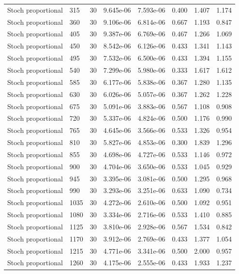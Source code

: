 \begin{scriptsize}
\begin{longtable}{llrrrrrr}
Stoch proportional & 315 & 30 & 9.645e-06 & 7.593e-06 & 0.400 & 1.407 & 1.174 \\
Stoch proportional & 360 & 30 & 9.106e-06 & 6.814e-06 & 0.667 & 1.193 & 0.847 \\
Stoch proportional & 405 & 30 & 9.387e-06 & 6.769e-06 & 0.467 & 1.266 & 1.069 \\
Stoch proportional & 450 & 30 & 8.542e-06 & 6.126e-06 & 0.433 & 1.341 & 1.143 \\
Stoch proportional & 495 & 30 & 7.532e-06 & 6.500e-06 & 0.433 & 1.394 & 1.155 \\
Stoch proportional & 540 & 30 & 7.299e-06 & 5.980e-06 & 0.333 & 1.617 & 1.612 \\
Stoch proportional & 585 & 30 & 6.177e-06 & 5.838e-06 & 0.367 & 1.280 & 1.135 \\
Stoch proportional & 630 & 30 & 6.026e-06 & 5.057e-06 & 0.367 & 1.262 & 1.228 \\
Stoch proportional & 675 & 30 & 5.091e-06 & 3.883e-06 & 0.567 & 1.108 & 0.908 \\
Stoch proportional & 720 & 30 & 5.337e-06 & 4.824e-06 & 0.500 & 1.176 & 0.990 \\
Stoch proportional & 765 & 30 & 4.645e-06 & 3.566e-06 & 0.533 & 1.326 & 0.954 \\
Stoch proportional & 810 & 30 & 5.827e-06 & 4.853e-06 & 0.300 & 1.839 & 1.296 \\
Stoch proportional & 855 & 30 & 4.698e-06 & 4.727e-06 & 0.533 & 1.146 & 0.972 \\
Stoch proportional & 900 & 30 & 4.704e-06 & 3.650e-06 & 0.533 & 1.045 & 0.929 \\
Stoch proportional & 945 & 30 & 3.395e-06 & 3.081e-06 & 0.500 & 1.295 & 0.968 \\
Stoch proportional & 990 & 30 & 3.293e-06 & 3.251e-06 & 0.633 & 1.090 & 0.734 \\
Stoch proportional & 1035 & 30 & 4.272e-06 & 2.610e-06 & 0.500 & 1.092 & 0.951 \\
Stoch proportional & 1080 & 30 & 3.334e-06 & 2.716e-06 & 0.533 & 1.410 & 0.885 \\
Stoch proportional & 1125 & 30 & 3.810e-06 & 2.928e-06 & 0.567 & 1.534 & 0.842 \\
Stoch proportional & 1170 & 30 & 3.912e-06 & 2.769e-06 & 0.433 & 1.377 & 1.054 \\
Stoch proportional & 1215 & 30 & 4.771e-06 & 3.341e-06 & 0.500 & 2.000 & 0.957 \\
Stoch proportional & 1260 & 30 & 4.175e-06 & 2.555e-06 & 0.433 & 1.933 & 1.237 \\

\end{longtable}
\end{scriptsize}
